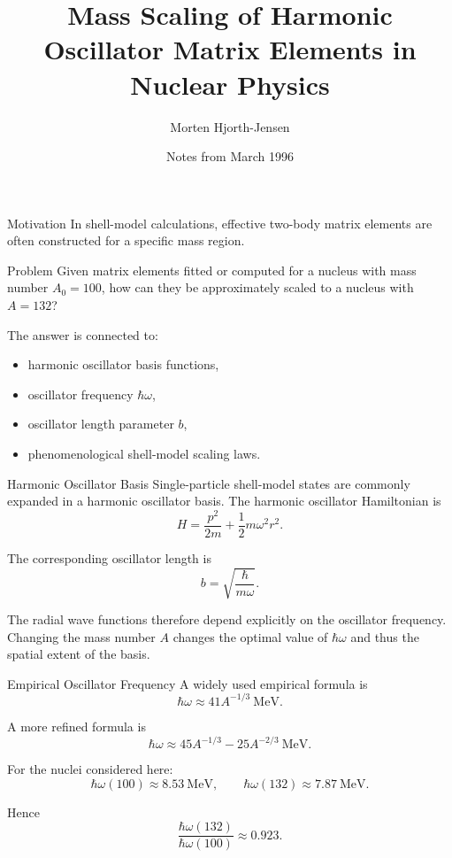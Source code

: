 \documentclass[10pt]{beamer}
\title[Mass Scaling of HO Matrix Elements]{Mass Scaling of Harmonic Oscillator Matrix Elements in Nuclear Physics}
\author{Morten Hjorth-Jensen}
\date{Notes from March 1996}
\begin{document}
\begin{frame}
\titlepage
\end{frame}

\begin{frame}[t]{Motivation}
\small
In shell-model calculations, effective two-body matrix elements are often
constructed for a specific mass region.

\medskip

\begin{block}{Problem}
Given matrix elements fitted or computed for a nucleus with mass number
\(A_0=100\), how can they be approximately scaled to a nucleus with
\(A=132\)?
\end{block}

\medskip

The answer is connected to:

\begin{itemize}
    \item harmonic oscillator basis functions,
    \item oscillator frequency \(\hbar\omega\),
    \item oscillator length parameter \(b\),
    \item phenomenological shell-model scaling laws.
\end{itemize}
\end{frame}

\begin{frame}[t]{Harmonic Oscillator Basis}
\small
Single-particle shell-model states are commonly expanded in a harmonic
oscillator basis. The harmonic oscillator Hamiltonian is
\[
H=\frac{p^2}{2m}+\frac{1}{2}m\omega^2 r^2 .
\]

The corresponding oscillator length is
\[
b=\sqrt{\frac{\hbar}{m\omega}} .
\]

The radial wave functions therefore depend explicitly on the oscillator
frequency. Changing the mass number \(A\) changes the optimal value of
\(\hbar\omega\) and thus the spatial extent of the basis.
\end{frame}

\begin{frame}[t]{Empirical Oscillator Frequency}
\small
A widely used empirical formula is
\[
\hbar\omega \approx 41 A^{-1/3}\ \mathrm{MeV} .
\]

A more refined formula is
\[
\hbar\omega \approx 45A^{-1/3}-25A^{-2/3}\ \mathrm{MeV} .
\]

For the nuclei considered here:
\[
\hbar\omega(100)\approx 8.53\ \mathrm{MeV}, \qquad
\hbar\omega(132)\approx 7.87\ \mathrm{MeV} .
\]

Hence
\[
\frac{\hbar\omega(132)}{\hbar\omega(100)}\approx 0.923 .
\]
\end{frame}
\end{document}

